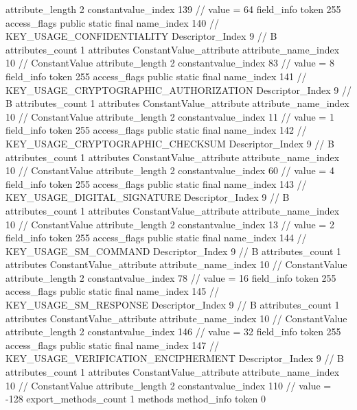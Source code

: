 {{{{{{{					attribute_length	2
					constantvalue_index	139		// value = 64
				}
				}
			}
			field_info {
				token	255
				access_flags	public static final
				name_index	140		// KEY_USAGE_CONFIDENTIALITY
				Descriptor_Index	9		// B
				attributes_count	1
				attributes {
				ConstantValue_attribute {
					attribute_name_index	10		// ConstantValue
					attribute_length	2
					constantvalue_index	83		// value = 8
				}
				}
			}
			field_info {
				token	255
				access_flags	public static final
				name_index	141		// KEY_USAGE_CRYPTOGRAPHIC_AUTHORIZATION
				Descriptor_Index	9		// B
				attributes_count	1
				attributes {
				ConstantValue_attribute {
					attribute_name_index	10		// ConstantValue
					attribute_length	2
					constantvalue_index	11		// value = 1
				}
				}
			}
			field_info {
				token	255
				access_flags	public static final
				name_index	142		// KEY_USAGE_CRYPTOGRAPHIC_CHECKSUM
				Descriptor_Index	9		// B
				attributes_count	1
				attributes {
				ConstantValue_attribute {
					attribute_name_index	10		// ConstantValue
					attribute_length	2
					constantvalue_index	60		// value = 4
				}
				}
			}
			field_info {
				token	255
				access_flags	public static final
				name_index	143		// KEY_USAGE_DIGITAL_SIGNATURE
				Descriptor_Index	9		// B
				attributes_count	1
				attributes {
				ConstantValue_attribute {
					attribute_name_index	10		// ConstantValue
					attribute_length	2
					constantvalue_index	13		// value = 2
				}
				}
			}
			field_info {
				token	255
				access_flags	public static final
				name_index	144		// KEY_USAGE_SM_COMMAND
				Descriptor_Index	9		// B
				attributes_count	1
				attributes {
				ConstantValue_attribute {
					attribute_name_index	10		// ConstantValue
					attribute_length	2
					constantvalue_index	78		// value = 16
				}
				}
			}
			field_info {
				token	255
				access_flags	public static final
				name_index	145		// KEY_USAGE_SM_RESPONSE
				Descriptor_Index	9		// B
				attributes_count	1
				attributes {
				ConstantValue_attribute {
					attribute_name_index	10		// ConstantValue
					attribute_length	2
					constantvalue_index	146		// value = 32
				}
				}
			}
			field_info {
				token	255
				access_flags	public static final
				name_index	147		// KEY_USAGE_VERIFICATION_ENCIPHERMENT
				Descriptor_Index	9		// B
				attributes_count	1
				attributes {
				ConstantValue_attribute {
					attribute_name_index	10		// ConstantValue
					attribute_length	2
					constantvalue_index	110		// value = -128
				}
				}
			}
			}
			export_methods_count	1
			methods {
				method_info {
					token	0
}}}}}

